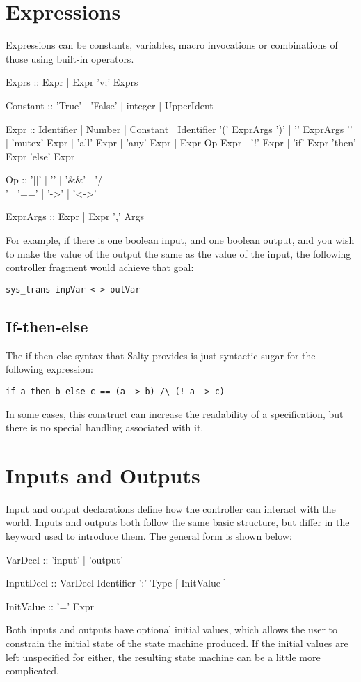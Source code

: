 \section{Expressions}

Expressions can be constants, variables, macro invocations or combinations of those using built-in operators.
\begin{Grammar}
    Exprs :: Expr | Expr 'v;' Exprs

    Constant :: 'True' | 'False' | integer | UpperIdent

    Expr :: Identifier | Number | Constant | Identifier '(' ExprArgs ')'
     | '{' ExprArgs '}' | 'mutex' Expr | 'all' Expr | 'any' Expr
     | Expr Op Expr | '!' Expr
     | 'if' Expr 'then' Expr 'else' Expr

    Op :: '||' | '\/' | '\&\&' | '/\\' | '==' | '->' | '<->'

    ExprArgs :: Expr | Expr ',' Args
\end{Grammar}

For example, if there is one boolean input, and one boolean output, and you wish to make the value of the output the same as the value of the input, the following controller fragment would achieve that goal:

\begin{lstlisting}
sys_trans inpVar <-> outVar
\end{lstlisting}

\subsection{If-then-else}

The if-then-else syntax that Salty provides is just syntactic sugar for the following expression:
\begin{lstlisting}
if a then b else c == (a -> b) /\ (! a -> c)
\end{lstlisting}
In some cases, this construct can increase the readability of a specification, but there is no special handling associated with it.

\section{Inputs and Outputs}

Input and output declarations define how the controller can interact with the world. Inputs and outputs both follow the same basic structure, but differ in the keyword used to introduce them. The general form is shown below:
\begin{Grammar}
  VarDecl :: 'input' | 'output'

  InputDecl :: VarDecl Identifier ':' Type [ InitValue ]

  InitValue :: '=' Expr
\end{Grammar}
Both inputs and outputs have optional initial values, which allows the user to constrain the initial state of the state machine produced. If the initial values are left unspecified for either, the resulting state machine can be a little more complicated.

